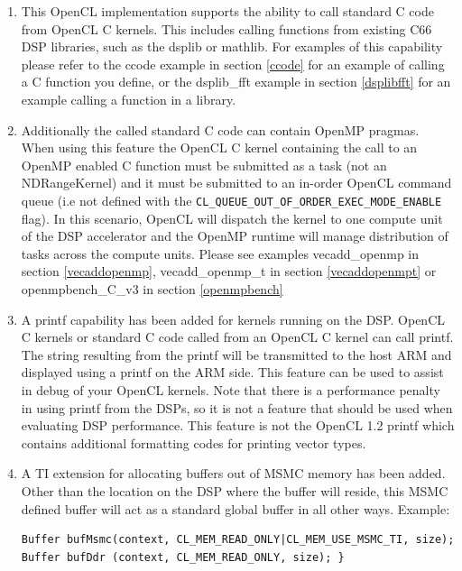 \documentclass[10pt]{article}
\begin{document}
\begin{enumerate}

\item This OpenCL implementation supports the ability to call standard C code from OpenCL C kernels. This includes calling functions from existing C66 DSP libraries, such as the dsplib or mathlib. For examples of this capability please refer to the ccode example in section \ref{ccode} for an example of calling a C function you define, or the dsplib\_fft example in section \ref{dsplibfft} for an example calling a function in a library.

\item Additionally the called standard C code can contain OpenMP pragmas. When using this feature the OpenCL C kernel containing the call to an OpenMP enabled C function must be submitted as a task (not an NDRangeKernel) and it must be submitted to an in-order OpenCL command queue (i.e not defined with the \verb!CL_QUEUE_OUT_OF_ORDER_EXEC_MODE_ENABLE! flag).  In this scenario, OpenCL will dispatch the kernel to one compute unit of the DSP accelerator and the OpenMP runtime will manage distribution of tasks across the compute units. Please see examples vecadd\_openmp in section \ref{vecaddopenmp}, vecadd\_openmp\_t in section \ref{vecaddopenmpt} or openmpbench\_C\_v3 in section \ref{openmpbench}

\item A printf capability has been added for kernels running on the DSP.  OpenCL
   C kernels or standard C code called from an OpenCL C kernel can call
   printf.  The string resulting from the printf will be transmitted to the host ARM and
   displayed using a printf on the ARM side.  This feature can be used to
   assist in debug of your OpenCL kernels.  Note that there is a performance
   penalty in using printf from the DSPs, so it is not a feature that should
   be used when evaluating DSP performance. This feature is not the OpenCL 1.2
   printf which contains additional formatting codes for printing vector
   types.

\item A TI extension for allocating buffers out of MSMC memory has been added. Other
   than the location on the DSP where the buffer will reside, this MSMC
   defined buffer will act as a standard global buffer in all other ways. Example:

\begin{verbatim}
Buffer bufMsmc(context, CL_MEM_READ_ONLY|CL_MEM_USE_MSMC_TI, size);
Buffer bufDdr (context, CL_MEM_READ_ONLY, size); }
\end{verbatim}


\end{enumerate}
\end{document}
